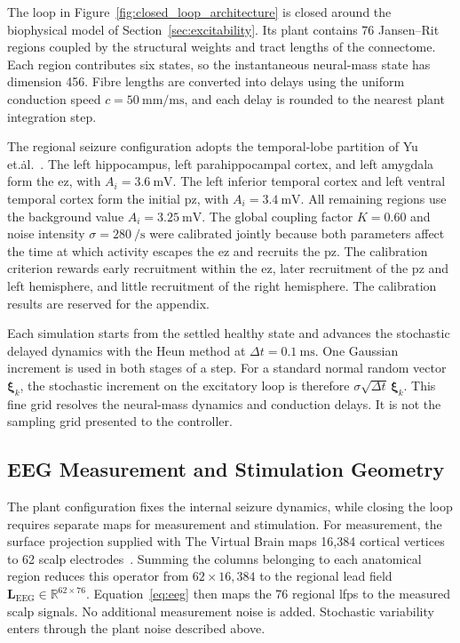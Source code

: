 The loop in Figure~\ref{fig:closed_loop_architecture} is closed around the biophysical
model of Section~\ref{sec:excitability}. Its plant contains 76 Jansen--Rit regions coupled
by the structural weights and tract lengths of the connectome. Each region contributes  %
six states, so the instantaneous neural-mass state has dimension 456. Fibre lengths are  %
converted into delays using the uniform conduction speed
$c=\SI{50}{\milli\metre\per\milli\second}$, and each delay is rounded to the nearest plant
integration step.

The regional seizure configuration adopts the temporal-lobe partition of Yu et.\.al.~\cite{Yu2024}. %
The left hippocampus, left parahippocampal cortex, and left amygdala form  %
the \ac{ez}, with $A_i=\SI{3.6}{\milli\volt}$. The left inferior temporal cortex and left
ventral temporal cortex form the initial \ac{pz}, with
$A_i=\SI{3.4}{\milli\volt}$. All remaining regions use the background value
$A_i=\SI{3.25}{\milli\volt}$. The global coupling factor $K=0.60$ and noise intensity
$\sigma=\SI{280}{\per\second}$ were calibrated jointly because both parameters affect the
time at which activity escapes the \ac{ez} and recruits the \ac{pz}. The calibration
criterion rewards early recruitment within the \ac{ez}, later recruitment of the \ac{pz}
and left hemisphere, and little recruitment of the right hemisphere. The calibration
results are reserved for the appendix.

Each simulation starts from the settled healthy state and advances the stochastic delayed
dynamics with the Heun method at $\Delta t=\SI{0.1}{\milli\second}$. One Gaussian increment
is used in both stages of a step. For a standard normal random vector
$\boldsymbol{\xi}_k$, the stochastic increment on the excitatory loop is therefore
$\sigma\sqrt{\Delta t}\,\boldsymbol{\xi}_k$. This fine grid resolves the neural-mass
dynamics and conduction delays. It is not the sampling grid presented to the controller.

\subsection{EEG Measurement and Stimulation Geometry}

The plant configuration fixes the internal seizure dynamics, while closing the loop
requires separate maps for measurement and stimulation. For measurement, the surface
projection supplied with The Virtual Brain maps 16,384 cortical vertices to 62 scalp
electrodes~\cite{SanzLeon2015}. Summing the columns belonging to each anatomical region
reduces this operator from $62\times16{,}384$ to the regional lead field
$\mathbf{L}_\mathrm{EEG}\in\mathbb{R}^{62\times76}$. Equation~\eqref{eq:eeg} then maps the
76 regional \acp{lfp} to the measured scalp signals. No additional measurement noise is
added. Stochastic variability enters through the plant noise described above.

